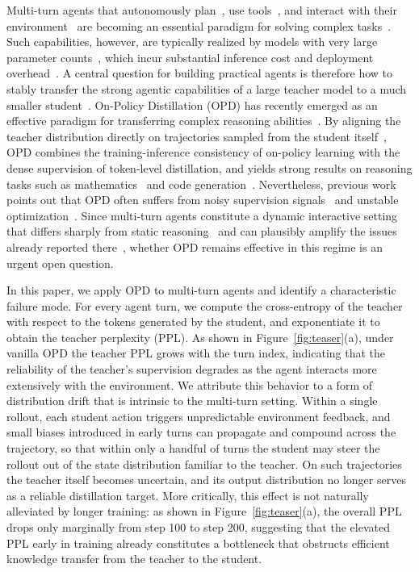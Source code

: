 \documentclass[11pt]{article}
\begin{document}
Multi-turn agents that autonomously plan~\citep{wang2023plan}, use tools~\citep{schick2023toolformer,singh2025agentic}, and interact with their environment~\citep{react,chen2025reinforcement} are becoming an essential paradigm for solving complex tasks~\citep{xi2023rise,demy}. Such capabilities, however, are typically realized by models with very large parameter counts~\citep{qwen2025qwen3}, which incur substantial inference cost and deployment overhead~\citep{xu2024ondevice}. A central question for building practical agents is therefore how to stably transfer the strong agentic capabilities of a large teacher model to a much smaller student~\citep{xu2024kd_llm_survey,AgentDistillation,Agentdistill,sad,coa}. On-Policy Distillation (OPD) has recently emerged as an effective paradigm for transferring complex reasoning abilities~\citep{lu2025onpolicydistillation,mimov2flash,sun2026simct,zhong2026sod}. By aligning the teacher distribution directly on trajectories sampled from the student itself~\citep{opd,gu2024minillm}, 
OPD combines the training-inference consistency of on-policy learning with the dense supervision of token-level distillation, 
and yields strong results on reasoning tasks such as mathematics~\citep{eopd, tip} and code generation~\citep{uniopd, yang2026learning}. 
Nevertheless, previous work points out that OPD often suffers from noisy supervision signals~\citep{fu2026revisiting,li2026rethinking} and unstable optimization~\citep{manyfaces2026,stableopd2026,opdsurvey,srpo,sdrlvr}. Since multi-turn agents constitute a dynamic interactive setting that differs sharply from static reasoning~\citep{demy,zhou2024archer} and can plausibly amplify the issues already reported there~\citep{xue2025simpletir,skillsd}, whether OPD remains effective in this regime is an urgent open question.

In this paper, we apply OPD to multi-turn agents and identify a characteristic failure mode. 
For every agent turn, we compute the cross-entropy of the teacher with respect to the tokens generated by the student, and exponentiate it to obtain the teacher perplexity (PPL). 
As shown in Figure~\ref{fig:teaser}(a), under vanilla OPD the teacher PPL grows with the turn index, indicating that the reliability of the teacher's supervision degrades as the agent interacts more extensively with the environment. 
We attribute this behavior to a form of distribution drift that is intrinsic to the multi-turn setting. 
Within a single rollout, each student action triggers unpredictable environment feedback, and small biases introduced in early turns can propagate and compound across the trajectory, so that within only a handful of turns the student may steer the rollout out of the state distribution familiar to the teacher. 
On such trajectories the teacher itself becomes uncertain, and its output distribution no longer serves as a reliable distillation target. More critically, this effect is not naturally alleviated by longer training: as shown in Figure~\ref{fig:teaser}(a), the overall PPL drops only marginally from step 100 to step 200, suggesting that the elevated PPL early in training already constitutes a bottleneck that obstructs efficient knowledge transfer from the teacher to the student.
\end{document}
